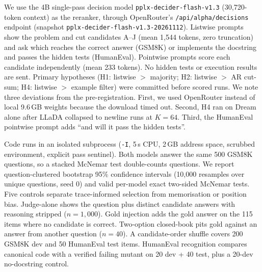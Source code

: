 We use the 4B single-pass decision model \texttt{pplx-decider-flash-v1.3} (30,720-token context) as the reranker, through OpenRouter's \texttt{/api/alpha/decisions} endpoint (snapshot \texttt{pplx-decider-flash-v1.3-20261112}). Listwise prompts show the problem and cut candidates A--J (mean 1,544 tokens, zero truncation) and ask which reaches the correct answer (GSM8K) or implements the docstring and passes the hidden tests (HumanEval). Pointwise prompts score each candidate independently (mean 233 tokens). No hidden tests or execution results are sent. Primary hypotheses (H1: listwise $>$ majority; H2: listwise $>$ AR cut-sum; H4: listwise $>$ example filter) were committed before scored runs. We note three deviations from the pre-registration. First, we used OpenRouter instead of local 9.6\,GB weights because the download timed out. Second, H4 ran on Dream alone after LLaDA collapsed to newline runs at $K=64$. Third, the HumanEval pointwise prompt adds ``and will it pass the hidden tests''.

Code runs in an isolated subprocess (\texttt{-I}, 5\,s CPU, 2\,GB address space, scrubbed environment, explicit pass sentinel). Both models answer the same 500 GSM8K questions, so a stacked McNemar test double-counts questions. We report question-clustered bootstrap 95\% confidence intervals (10,000 resamples over unique questions, seed 0) and valid per-model exact two-sided McNemar tests. Five controls separate trace-informed selection from memorisation or position bias. Judge-alone shows the question plus distinct candidate answers with reasoning stripped ($n=1,000$). Gold injection adds the gold answer on the 115 items where no candidate is correct. Two-option closed-book pits gold against an answer from another question ($n=40$). A candidate-order shuffle covers 200 GSM8K dev and 50 HumanEval test items. HumanEval recognition compares canonical code with a verified failing mutant on 20 dev + 40 test, plus a 20-dev no-docstring control.
